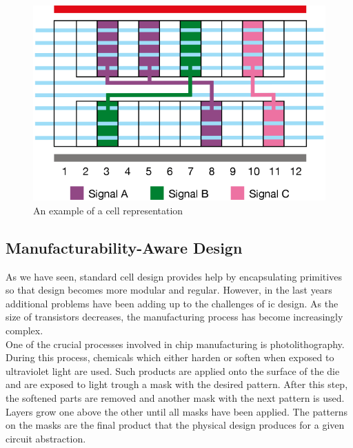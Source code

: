 \begin{figure}[h!]
  \centering
  \includegraphics[scale=0.8]{img/bckgrnd/Celabase.png}
  \caption{An example of a cell representation}
  \label{fig:celabase}
\end{figure}



\subsection{Manufacturability-Aware Design}

As we have seen, standard cell design provides help by encapsulating primitives so that design becomes more modular and regular. However, in the last years additional problems have been adding up to the challenges of \gls{ic} design. As the size of transistors decreases, the manufacturing process has become increasingly complex. \\

One of the crucial processes involved in chip manufacturing is photolithography. During this process, chemicals which either harden or soften when exposed to ultraviolet light are used. Such products are applied onto the surface of the die and are exposed to light trough a mask with the desired pattern. After this step, the softened parts are removed and another mask with the next pattern is used. Layers grow one above the other until all masks have been applied. The patterns on the masks are the final product that the physical design produces for a given circuit abstraction. \\

